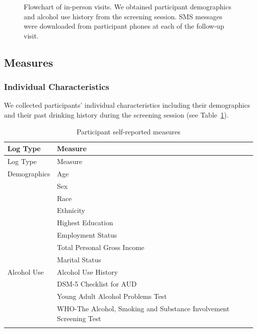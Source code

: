 \documentclass[
  letterpaper,
  DIV=11,
  numbers=noendperiod]{scrartcl}
\begin{document}
\begin{figure}


\caption{\label{fig-simp}Flowchart of in-person visits. We obtained
participant demographics and alcohol use history from the screening
session. SMS messages were downloaded from participant phones at each of
the follow-up visit.}

\end{figure}%

\subsection{Measures}\label{measures}

\subsubsection{Individual
Characteristics}\label{individual-characteristics}

We collected participants' individual characteristics including their
demographics and their past drinking history during the screening
session (see Table~\ref{tbl-measures}).

\begin{longtable}[]{@{}ll@{}}
\toprule\noalign{}
Log Type & Measure \\
\midrule\noalign{}
\endfirsthead
\toprule\noalign{}
Log Type & Measure \\
\midrule\noalign{}
\endhead
\bottomrule\noalign{}
\endlastfoot
Demographics & Age \\
& Sex \\
& Race \\
& Ethnicity \\
& Highest Education \\
& Employment Status \\
& Total Personal Gross Income \\
& Marital Status \\
Alcohol Use & Alcohol Use History \\
& DSM-5 Checklist for AUD \\
& Young Adult Alcohol Problems Test \\
& WHO-The Alcohol, Smoking and Substance Involvement Screening Test \\
\caption{Participant self-reported
measures}\label{tbl-measures}\tabularnewline
\end{longtable}
\end{document}

